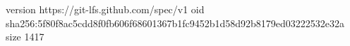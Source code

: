 version https://git-lfs.github.com/spec/v1
oid sha256:5f80f8ac5cdd8f0fb606f68601367b1fc9452b1d58d92b8179ed03222532e32a
size 1417
